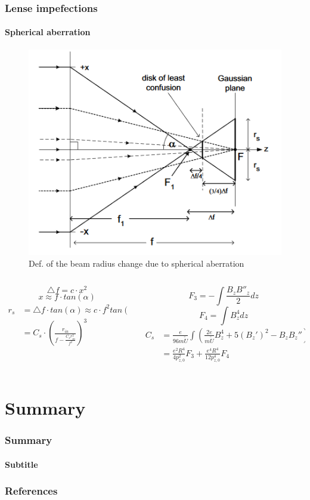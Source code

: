 \documentclass{beamer}
\begin{document}
  \begin{frame}
  \frametitle{Lense impefections}
  \framesubtitle{Spherical aberration}
  \begin{figure}[t]
    \includegraphics[width=.3\textwidth]{Spher_Abb1.png}
  \begin{tiny}
    \caption{Def. of the beam radius change due to spherical aberration}
  \end{tiny}
  \end{figure}
  \begin{tiny}
\begin{columns}
  \begin{column}{0.4\textwidth}
   \begin{equation}
  \triangle f=c\cdotp x^{2}
    \end{equation}
   \begin{equation}
  x\approx f\cdotp tan\left(\alpha\right)
    \end{equation}
   \begin{align}
  r_{s}&=\triangle f\cdotp tan\left(\alpha\right)\approx c\cdotp f^{2}tan\left(\alpha\right)^{3}\\
&=C_{s}\cdotp\left(\frac{r_{in}}{f-\frac{C_{s}r_{in}^{2}}{f^{2}}}\right)^{3}
    \end{align}
  \end{column}
  \begin{column}{0.6\textwidth}
    \begin{equation}
  F_{3}=-\int\frac{B_{z}B''_{z}}{2}dz
    \end{equation}
    \begin{equation}
  F_{4}=\int B_{z}^{4}dz
    \end{equation}
    \begin{align}
  C_{s}&=\frac{e}{96m\tilde{U}}\int\left(\frac{2e}{m\tilde{U}}B_{z}^{4}+5\left(B_{z}'\right)^{2}-B_{z}B_{z}''\right)R^{4}dz \\
  &=\frac{e^{2}R^{4}}{4p_{z,0}^{2}}F_{3}+\frac{e^{4}R^{4}}{12p_{z,0}^{4}}F_{4}
  \end{align}
  \end{column}
 \end{columns}
  \end{tiny}
  \end{frame}

\section{Summary}
\begin{frame}
  \frametitle{Summary}
  \framesubtitle{Subtitle}
\end{frame}

\begin{frame}[allowframebreaks]
  \frametitle{References}
  \printbibliography
\end{frame}
\end{document}
